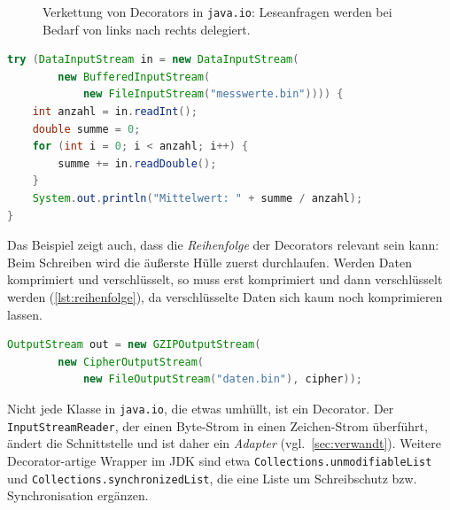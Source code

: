 \documentclass[a4paper,11pt,toc=listof,toc=bibliography]{scrartcl}
\begin{document}
\begin{figure}[H]
  \centering
  \caption{Verkettung von Decorators in \texttt{java.io}: Leseanfragen werden bei Bedarf von links nach rechts delegiert.}
  \label{fig:io}
\end{figure}

\begin{lstlisting}[language=Java,caption={Verschachtelte Stream-Decorators (innerhalb einer Methode mit \texttt{throws IOException})},label={lst:io}]
try (DataInputStream in = new DataInputStream(
        new BufferedInputStream(
            new FileInputStream("messwerte.bin")))) {
    int anzahl = in.readInt();
    double summe = 0;
    for (int i = 0; i < anzahl; i++) {
        summe += in.readDouble();
    }
    System.out.println("Mittelwert: " + summe / anzahl);
}
\end{lstlisting}

Das Beispiel zeigt auch, dass die \emph{Reihenfolge} der Decorators relevant sein kann: Beim Schreiben wird die äußerste Hülle zuerst durchlaufen. Werden Daten komprimiert und verschlüsselt, so muss erst komprimiert und dann verschlüsselt werden (\autoref{lst:reihenfolge}), da verschlüsselte Daten sich kaum noch komprimieren lassen.

\noindent
\begin{minipage}{\linewidth}
\begin{lstlisting}[language=Java,caption={Reihenfolge der Decorators: erst komprimieren, dann verschlüsseln (\texttt{cipher} sei ein initialisiertes \texttt{javax.crypto.Cipher})},label={lst:reihenfolge}]
OutputStream out = new GZIPOutputStream(
        new CipherOutputStream(
            new FileOutputStream("daten.bin"), cipher));
\end{lstlisting}
\end{minipage}

Nicht jede Klasse in \texttt{java.io}, die etwas umhüllt, ist ein Decorator. Der \texttt{InputStreamReader}, der einen Byte-Strom in einen Zeichen-Strom überführt, ändert die Schnittstelle und ist daher ein \emph{Adapter} (vgl.\ \autoref{sec:verwandt}). Weitere Decorator-artige Wrapper im \ac{JDK} sind etwa \texttt{Collections.unmodifiableList} und \texttt{Collections.synchronizedList}, die eine Liste um Schreibschutz bzw. Synchronisation ergänzen.
\end{document}
